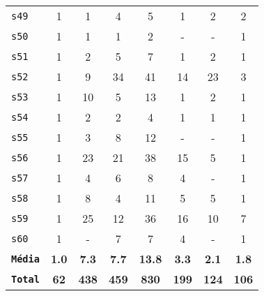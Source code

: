 \begin{longtable}{ l c c c c c c c }
\texttt{s49} & 1 & 1 & 4 & 5 & 1 & 2 & 2 \\
\texttt{s50} & 1 & 1 & 1 & 2 & - & - & 1 \\
\texttt{s51} & 1 & 2 & 5 & 7 & 1 & 2 & 1 \\
\texttt{s52} & 1 & 9 & 34 & 41 & 14 & 23 & 3 \\
\texttt{s53} & 1 & 10 & 5 & 13 & 1 & 2 & 1 \\
\texttt{s54} & 1 & 2 & 2 & 4 & 1 & 1 & 1 \\
\texttt{s55} & 1 & 3 & 8 & 12 & - & - & 1 \\
\texttt{s56} & 1 & 23 & 21 & 38 & 15 & 5 & 1 \\
\texttt{s57} & 1 & 4 & 6 & 8 & 4 & - & 1 \\
\texttt{s58} & 1 & 8 & 4 & 11 & 5 & 5 & 1 \\
\texttt{s59} & 1 & 25 & 12 & 36 & 16 & 10 & 7 \\
\texttt{s60} & 1 & - & 7 & 7 & 4 & - & 1 \\
\texttt{{\bf Média}} & {\bf 1.0} & {\bf 7.3} & {\bf 7.7} & {\bf 13.8} & {\bf 3.3} & {\bf 2.1} & {\bf 1.8} \\
\texttt{{\bf Total}} & {\bf 62} & {\bf 438} & {\bf 459} & {\bf 830} & {\bf 199} & {\bf 124} & {\bf 106} \\
\end{longtable}
